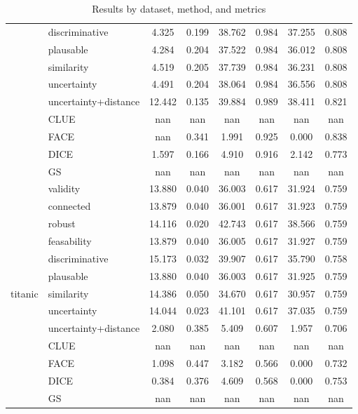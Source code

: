 \begin{table}[ht]
\begin{tabular}{l l c c c c c c}
 & discriminative & 4.325 & 0.199 & 38.762 & 0.984 & 37.255 & 0.808 \\ 
 & plausable & 4.284 & 0.204 & 37.522 & 0.984 & 36.012 & 0.808 \\ 
 & similarity & 4.519 & 0.205 & 37.739 & 0.984 & 36.231 & 0.808 \\ 
 & uncertainty & 4.491 & 0.204 & 38.064 & 0.984 & 36.556 & 0.808 \\ 
 & uncertainty+distance & 12.442 & 0.135 & 39.884 & 0.989 & 38.411 & 0.821 \\ 
 & CLUE & nan & nan & nan & nan & nan & nan \\ 
 & FACE & nan & 0.341 & 1.991 & 0.925 & 0.000 & 0.838 \\ 
 & DICE & 1.597 & 0.166 & 4.910 & 0.916 & 2.142 & 0.773 \\ 
 & GS & nan & nan & nan & nan & nan & nan \\ 
\hline
\multirow{13}{*}{titanic} & validity & 13.880 & 0.040 & 36.003 & 0.617 & 31.924 & 0.759 \\ 
 & connected & 13.879 & 0.040 & 36.001 & 0.617 & 31.923 & 0.759 \\ 
 & robust & 14.116 & 0.020 & 42.743 & 0.617 & 38.566 & 0.759 \\ 
 & feasability & 13.879 & 0.040 & 36.005 & 0.617 & 31.927 & 0.759 \\ 
 & discriminative & 15.173 & 0.032 & 39.907 & 0.617 & 35.790 & 0.758 \\ 
 & plausable & 13.880 & 0.040 & 36.003 & 0.617 & 31.925 & 0.759 \\ 
 & similarity & 14.386 & 0.050 & 34.670 & 0.617 & 30.957 & 0.759 \\ 
 & uncertainty & 14.044 & 0.023 & 41.101 & 0.617 & 37.035 & 0.759 \\ 
 & uncertainty+distance & 2.080 & 0.385 & 5.409 & 0.607 & 1.957 & 0.706 \\ 
 & CLUE & nan & nan & nan & nan & nan & nan \\ 
 & FACE & 1.098 & 0.447 & 3.182 & 0.566 & 0.000 & 0.732 \\ 
 & DICE & 0.384 & 0.376 & 4.609 & 0.568 & 0.000 & 0.753 \\ 
 & GS & nan & nan & nan & nan & nan & nan \\ 
\hline
\end{tabular}
\caption{Results by dataset, method, and metrics}
\label{tab:results}
\end{table}